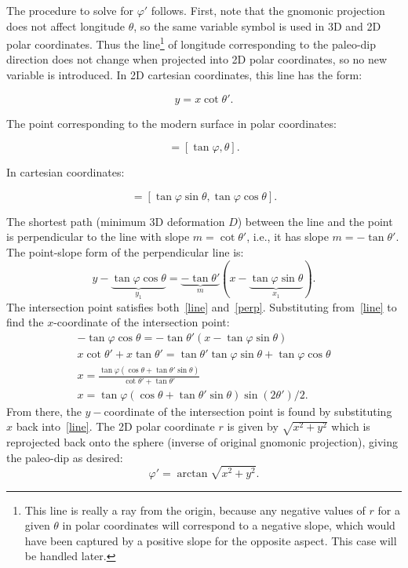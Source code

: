 

The procedure to solve for $\varphi'$ follows. First, note that the gnomonic projection does not affect longitude $\theta$, so the same variable symbol is used in 3D and 2D polar coordinates. Thus the line\footnote{This line is really a ray from the origin, because any negative values of $r$ for a given $\theta$ in polar coordinates will correspond to a negative slope, which would have been captured by a positive slope for the opposite aspect. This case will be handled later.} of longitude corresponding to the paleo-dip direction does not change when projected into 2D polar coordinates, so no new variable is introduced. In 2D cartesian coordinates, this line has the form:

\begin{equation}
    y=x\cot \theta'.\label{line}
\end{equation}

The point corresponding to the modern surface in polar coordinates:

\begin{equation}
    [r,\theta] = [\tan \varphi, \theta].
\end{equation}

In cartesian coordinates:

\begin{equation}
    [x,y]=[\tan\varphi\sin\theta,\tan\varphi\cos\theta].\label{point}
\end{equation}

The shortest path (minimum 3D deformation $D$) between the line and the point is perpendicular to the line with slope $m=\cot \theta'$, i.e., it has slope $m=-\tan \theta'$. The point-slope form of the perpendicular line is:
\begin{equation}
    y-\underbrace{\tan\varphi\cos\theta}_{y_1}=\underbrace{-\tan \theta'}_{m}(x-\underbrace{\tan\varphi\sin\theta}_{x_1}).\label{perp}
\end{equation}
The intersection point satisfies both~\ref{line} and~\ref{perp}. Substituting from~\ref{line} to find the $x$-coordinate of the intersection point: 
\begin{gather}
    [x\cot \theta']-\tan\varphi\cos\theta=-\tan \theta'(x-\tan\varphi\sin\theta)\nonumber\\
    x\cot \theta'+x\tan \theta'=\tan \theta'\tan\varphi\sin\theta+\tan\varphi\cos\theta\nonumber\\
    x=\frac{\tan\varphi(\cos\theta+\tan\theta'\sin\theta)}{\cot\theta'+\tan\theta'}\nonumber\\
    \boxed{x=\tan\varphi(\cos\theta+\tan\theta'\sin\theta)\sin(2\theta')/2.}\label{x}
\end{gather}
From there, the $y-$coordinate of the intersection point is found by substituting $x$ back into~\eqref{line}. The 2D polar coordinate $r$ is given by $\sqrt{x^2+y^2}$ which is reprojected back onto the sphere (inverse of original gnomonic projection), giving the paleo-dip as desired:
\begin{equation}
    \varphi'=\arctan\sqrt{x^2+y^2}.
\end{equation}
